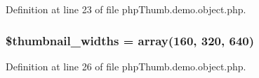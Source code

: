 \-Definition at line 23 of file php\-Thumb.\-demo.\-object.\-php.

\hypertarget{php_thumb_8demo_8object_8php_a528541226e3cb081dcae8f65252eeb74}{
\subsubsection[{\$thumbnail\-\_\-widths}]{\setlength{\rightskip}{0pt plus 5cm}\$thumbnail\-\_\-widths = array(160, 320, 640)}}\label{php_thumb_8demo_8object_8php_a528541226e3cb081dcae8f65252eeb74}


\-Definition at line 26 of file php\-Thumb.\-demo.\-object.\-php.

